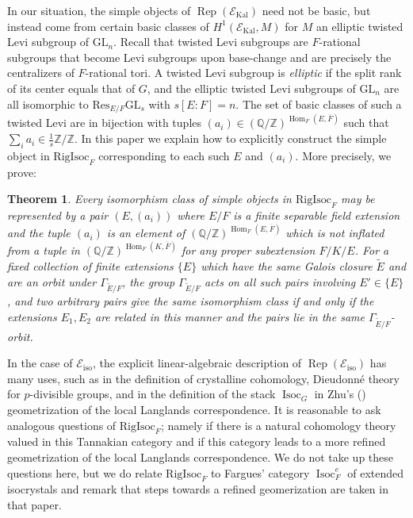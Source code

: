 \documentclass[11pt]{amsart}
\newtheorem{thm}{Theorem}[section]
\theoremstyle{definition}
\newcommand{\mc}{\mathcal}
\newcommand{\Z}{\mathbb{Z}}
\newcommand{\Q}{\mathbb{Q}}
\newcommand{\ov}{\overline}
\newcommand{\Res}{\mathrm{Res}}
\newcommand{\RigIsoc}{\mathrm{RigIsoc}}
\newcommand{\GL}{\mathrm{GL}}
\DeclareMathOperator{\Kal}{Kal}
\DeclareMathOperator{\Hom}{Hom}
\DeclareMathOperator{\Rep}{Rep}
\DeclareMathOperator{\Isoc}{Isoc}
\DeclareMathOperator{\iso}{iso}
\begin{document}
In our situation, the simple objects of $\Rep(\mc{E}_{\Kal})$ need not be basic, but instead come from certain basic classes of $H^1(\mc{E}_{\Kal}, M)$ for $M$ an elliptic twisted Levi subgroup of $\GL_n$. Recall that twisted Levi subgroups are $F$-rational subgroups that become Levi subgroups upon base-change and are precisely the centralizers of $F$-rational tori. A twisted Levi subgroup is \emph{elliptic} if the split rank of its center equals that of $G$, and the elliptic twisted Levi subgroups of $\GL_n$ are all isomorphic to $\Res_{E/F}\GL_s$ with $s[E \colon F] =n$. The set of basic classes of such a twisted Levi are in bijection with tuples $(a_i) \in (\Q/\Z)^{\Hom_{F}(E,\ov{F})}$ such that $\sum\limits_i a_i \in \frac{1}{s} \Z / \Z$. In this paper we explain how to explicitly construct the simple object in $\RigIsoc_{F}$ corresponding to each such $E$ and $(a_{i})$. More precisely, we prove:

\begin{thm} 
Every isomorphism class of simple objects in $\RigIsoc_{F}$ may be represented by a pair $(E, (a_{i}))$ where $E/F$ is a finite separable field extension and the tuple $(a_{i})$ is an element of $(\Q/\Z)^{\Hom_{F}(E,\ov{F})}$ which is not inflated from a tuple in $(\Q/\Z)^{\Hom_{F}(K,\ov{F})}$ for any proper subextension $F/K/E$. For a fixed collection of finite extensions $\{E\}$ which have the same Galois closure $\widetilde{E}$ and are an orbit under $\Gamma_{\widetilde{E}/F}$, the group $\Gamma_{\widetilde{E}/F}$ acts on all such pairs involving $E' \in \{E\}$, and two arbitrary pairs give the same isomorphism class if and only if the extensions $E_{1}, E_{2}$ are related in this manner and the pairs lie in the same $\Gamma_{\widetilde{E}/F}$-orbit.
 \end{thm}

In the case of $\mc{E}_{\iso}$, the explicit linear-algebraic description of $\Rep(\mc{E}_{\text{iso}})$ has many uses, such as in the definition of crystalline cohomology, Dieudonn\'{e} theory for $p$-divisible groups, and in the definition of the stack $\Isoc_G$ in Zhu's (\cite{Zhu25}) geometrization of the local Langlands correspondence. It is reasonable to ask analogous questions of $\RigIsoc_F$; namely if there is a natural cohomology theory valued in this Tannakian category and if this category leads to a more refined geometrization of the local Langlands correspondence. We do not take up these questions here, but we do relate $\RigIsoc_F$ to Fargues' category $\Isoc_{F}^e$ of extended isocrystals \cite{Fargues} and remark that steps towards a refined geomerization are taken in that paper.
\end{document}
